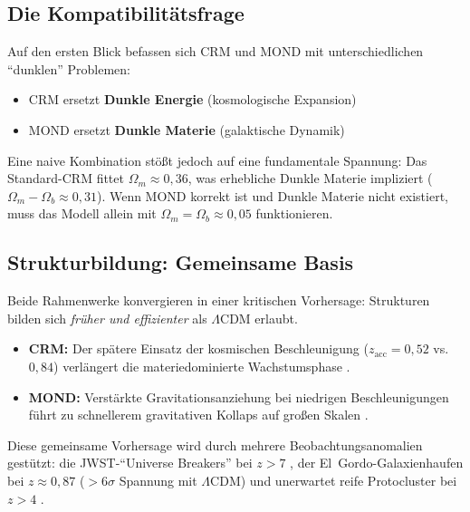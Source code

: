 \documentclass[aps,prd,twocolumn,superscriptaddress,nofootinbib]{revtex4-2}
\begin{document}
\subsection{Die Kompatibilit\"atsfrage}

Auf den ersten Blick befassen sich CRM und MOND mit unterschiedlichen "`dunklen"' Problemen:
\begin{itemize}
\item CRM ersetzt \textbf{Dunkle Energie} (kosmologische Expansion)
\item MOND ersetzt \textbf{Dunkle Materie} (galaktische Dynamik)
\end{itemize}

Eine naive Kombination st\"oßt jedoch auf eine fundamentale Spannung: Das Standard-CRM fittet $\Omega_m \approx 0{,}36$, was erhebliche Dunkle Materie impliziert ($\Omega_m - \Omega_b \approx 0{,}31$). Wenn MOND korrekt ist und Dunkle Materie nicht existiert, muss das Modell allein mit $\Omega_m = \Omega_b \approx 0{,}05$ funktionieren.

\subsection{Strukturbildung: Gemeinsame Basis}

Beide Rahmenwerke konvergieren in einer kritischen Vorhersage: Strukturen bilden sich \textit{fr\"uher und effizienter} als $\Lambda$CDM erlaubt.

\begin{itemize}
\item \textbf{CRM:} Der sp\"atere Einsatz der kosmischen Beschleunigung ($z_{\mathrm{acc}} = 0{,}52$ vs.\ $0{,}84$) verl\"angert die materiedominierte Wachstumsphase \cite{Geiger2026}.
\item \textbf{MOND:} Verst\"arkte Gravitationsanziehung bei niedrigen Beschleunigungen f\"uhrt zu schnellerem gravitativen Kollaps auf großen Skalen \cite{Asencio2023}.
\end{itemize}

Diese gemeinsame Vorhersage wird durch mehrere Beobachtungsanomalien gest\"utzt: die JWST-"`Universe Breakers"' bei $z > 7$ \cite{Labbe2023, BoylanKolchin2023}, der El~Gordo-Galaxienhaufen bei $z \approx 0{,}87$ (${>}6\sigma$ Spannung mit $\Lambda$CDM) \cite{Asencio2023} und unerwartet reife Protocluster bei $z > 4$ \cite{Miller2018}.

\end{document}
